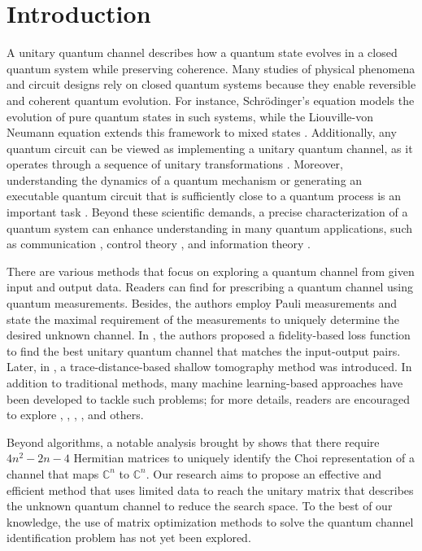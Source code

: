 \documentclass[sn-mathphys-num]{sn-jnl}%
\theoremstyle{thmstyleone}%
\theoremstyle{thmstyletwo}%
\theoremstyle{thmstylethree}%
\begin{document}
\section{Introduction}
A unitary quantum channel describes how a quantum state evolves in a closed quantum system while preserving coherence. Many studies of physical phenomena and circuit designs rely on closed quantum systems because they enable reversible and coherent quantum evolution. 
For instance, Schr\"{o}dinger's equation models the evolution of pure quantum states in such systems, while the Liouville-von Neumann equation extends this framework to mixed states \cite{Rivas12}. Additionally, any quantum circuit can be viewed as implementing a unitary quantum channel, as it operates through a sequence of unitary transformations \cite{Iten17}. Moreover, understanding the dynamics of a quantum mechanism or generating an executable quantum circuit that is sufficiently close to a quantum process is an important task \cite{Kunjummen23}. Beyond these scientific demands, a precise characterization of a quantum system can enhance understanding in many quantum applications, such as communication \cite{Gisin07}, control theory \cite{Dong10}, and information theory \cite{Petz86}.

There are various methods that focus on exploring a quantum channel from given input and output data. Readers can find \cite{Chuang97} for prescribing a quantum channel using quantum measurements. Besides, the authors \cite{Gross10} employ Pauli measurements and state the maximal requirement of the measurements to uniquely determine the desired unknown channel. In \cite{Bisio10}, the authors proposed a fidelity-based loss function to find the best unitary quantum channel that matches the input-output pairs. Later, in \cite{Kunjummen23}, a trace-distance-based shallow tomography method was introduced. In addition to traditional methods, many machine learning-based approaches have been developed to tackle such problems; for more details, readers are encouraged to explore \cite{Alvarez17}, \cite{Cemin24}, \cite{Kardashin22}, \cite{Huang22}, and others. 

Beyond algorithms, a notable analysis brought by \cite{Gutoski14} shows that there require $4n^2-2n-4$ Hermitian matrices to uniquely identify the Choi representation of a channel that maps $\mathbb{C
}^n$ to $\mathbb{C}^n$. Our research aims to propose an effective and efficient method that uses limited data to reach the unitary matrix that describes the unknown quantum channel to reduce the search space. To the best of our knowledge, the use of matrix optimization methods to solve the quantum channel identification problem has not yet been explored.
\end{document}
